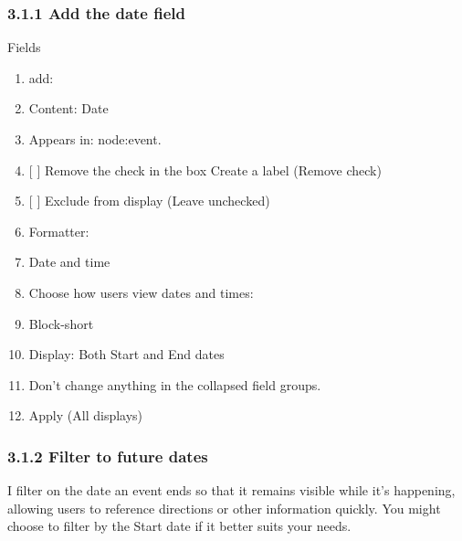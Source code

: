 \documentclass[letterpaper,10pt,english]{sphinxmanual}
\begin{document}
\subsubsection{3.1.1 Add the date field}
\label{event_calendar:id1}
Fields
\begin{enumerate}
\item {} 
add:

\item {} 
Content: Date

\item {} 
Appears in: node:event.

\item {} 
{[} {]} Remove the check in the box Create a label (Remove check)

\item {} 
{[} {]} Exclude from display (Leave unchecked)

\item {} 
Formatter:

\item {} 
Date and time

\item {} 
Choose how users view dates and times:

\item {} 
Block-short

\item {} 
Display: Both Start and End dates

\item {} 
Don't change anything in the collapsed field groups.

\item {} 
Apply (All displays)

\end{enumerate}


\subsubsection{3.1.2 Filter to future dates}
\label{event_calendar:filter-to-future-dates}
I filter on the date an event ends so that it remains visible while it's happening, allowing users to reference directions or other information quickly. You might choose to filter by the Start date if it better suits your needs.
\end{document}
